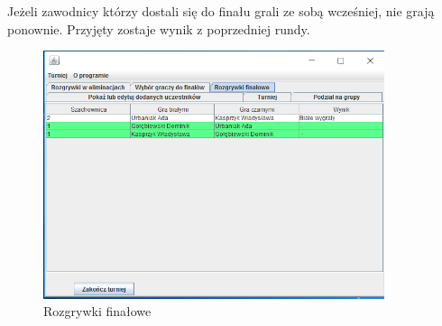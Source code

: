 Jeżeli zawodnicy którzy dostali się do finału grali ze sobą wcześniej, nie grają ponownie. Przyjęty zostaje wynik z poprzedniej rundy.
\begin{figure}[H]
	\centering
	\includegraphics[width=10cm]{fig/16}
	\caption{Rozgrywki finałowe}
	\label {fig:rozgrywka_finalowa_2} 
\end{figure}

